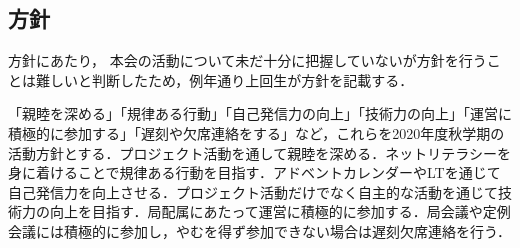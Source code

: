 \subsection*{\firstGrade{}方針}

\firstGrade{}方針にあたり，
本会の活動について未だ十分に把握していない\firstGrade{}が方針を行うことは難しいと判断したため，例年通り上回生が\firstGrade{}方針を記載する．

「親睦を深める」「規律ある行動」「自己発信力の向上」「技術力の向上」「運営に積極的に参加する」「遅刻や欠席連絡をする」など，これらを\firstGrade{}2020年度秋学期の活動方針とする．プロジェクト活動を通して親睦を深める．ネットリテラシーを身に着けることで規律ある行動を目指す．アドベントカレンダーやLTを通じて自己発信力を向上させる．プロジェクト活動だけでなく自主的な活動を通じて技術力の向上を目指す．局配属にあたって運営に積極的に参加する．局会議や定例会議には積極的に参加し，やむを得ず参加できない場合は遅刻欠席連絡を行う．
